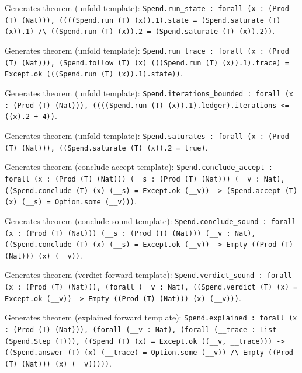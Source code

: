 \documentclass[11pt]{article}
\begin{document}
\noindent Generates theorem (unfold template): \texttt{Spend.run\_state : forall (x : (Prod (T) (Nat))), ((((Spend.run (T) (x)).1).state = (Spend.saturate (T) (x)).1) /\textbackslash{} ((Spend.run (T) (x)).2 = (Spend.saturate (T) (x)).2))}.\par
\noindent Generates theorem (unfold template): \texttt{Spend.run\_trace : forall (x : (Prod (T) (Nat))), (Spend.follow (T) (x) (((Spend.run (T) (x)).1).trace) = Except.ok (((Spend.run (T) (x)).1).state))}.\par
\noindent Generates theorem (unfold template): \texttt{Spend.iterations\_bounded : forall (x : (Prod (T) (Nat))), ((((Spend.run (T) (x)).1).ledger).iterations <= ((x).2 + 4))}.\par
\noindent Generates theorem (unfold template): \texttt{Spend.saturates : forall (x : (Prod (T) (Nat))), ((Spend.saturate (T) (x)).2 = true)}.\par
\noindent Generates theorem (conclude accept template): \texttt{Spend.conclude\_accept : forall (x : (Prod (T) (Nat))) (\_\_s : (Prod (T) (Nat))) (\_\_v : Nat), ((Spend.conclude (T) (x) (\_\_s) = Except.ok (\_\_v)) -> (Spend.accept (T) (x) (\_\_s) = Option.some (\_\_v)))}.\par
\noindent Generates theorem (conclude sound template): \texttt{Spend.conclude\_sound : forall (x : (Prod (T) (Nat))) (\_\_s : (Prod (T) (Nat))) (\_\_v : Nat), ((Spend.conclude (T) (x) (\_\_s) = Except.ok (\_\_v)) -> Empty ((Prod (T) (Nat))) (x) (\_\_v))}.\par
\noindent Generates theorem (verdict forward template): \texttt{Spend.verdict\_sound : forall (x : (Prod (T) (Nat))), (forall (\_\_v : Nat), ((Spend.verdict (T) (x) = Except.ok (\_\_v)) -> Empty ((Prod (T) (Nat))) (x) (\_\_v)))}.\par
\noindent Generates theorem (explained forward template): \texttt{Spend.explained : forall (x : (Prod (T) (Nat))), (forall (\_\_v : Nat), (forall (\_\_trace : List (Spend.Step (T))), ((Spend (T) (x) = Except.ok ((\_\_v, \_\_trace))) -> ((Spend.answer (T) (x) (\_\_trace) = Option.some (\_\_v)) /\textbackslash{} Empty ((Prod (T) (Nat))) (x) (\_\_v)))))}.\par
\end{document}
